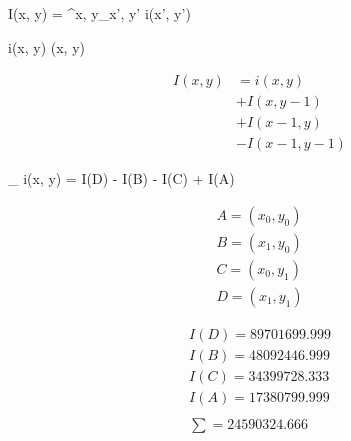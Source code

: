 %
%

I(x, y) = \sum^{x, y}_{x', y'} i(x', y')

i(x, y)
(x, y)

\begin{align}
I(x, y) & = i (x, y) \nonumber \\
& + I(x, y - 1) \nonumber \\
& + I (x - 1, y) \nonumber \\
& - I(x - 1, y -1) \nonumber
\end{align}

\sum_{} i(x, y) = I(D) - I(B) - I(C) + I(A) 

\begin{align}
A = (x_0, y_0) \nonumber \\
B = (x_1, y_0) \nonumber \\
C = (x_0, y_1) \nonumber \\
D = (x_1, y_1) \nonumber
\end{align}

\begin{align}
I(D) = 89701699.999 \nonumber \\
I(B) = 48092446.999 \nonumber \\
I(C) = 34399728.333 \nonumber \\
I(A) = 17380799.999 \nonumber \\
\nonumber \\
\sum = 24590324.666 \nonumber
\end{align}
